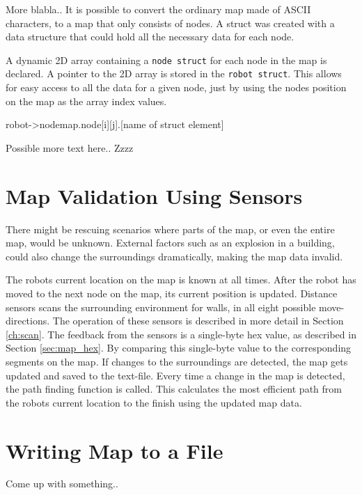More blabla.. It is possible to convert the ordinary map made of ASCII characters, to a map that only consists of nodes.
A struct was created with a data structure that could hold all the necessary data for each node.

A dynamic 2D array containing a {\tt node struct} for each node in the map is declared. 
A pointer to the 2D array is stored in the {\tt robot struct}.
This allows for easy access to all the data for a given node, just by using the nodes position on the map as the array index values.

robot->nodemap.node[i][j].[name of struct element]

Possible more text here.. Zzzz

\section{Map Validation Using Sensors}
\label{sec:map_check} %
There might be rescuing scenarios where parts of the map, or even the entire map, would be unknown.
External factors such as an explosion in a building, could also change the surroundings dramatically, making the map data invalid.
 
The robots current location on the map is known at all times. 
After the robot has moved to the next node on the map, its current position is updated.
Distance sensors scans the surrounding environment for walls, in all eight possible move-directions.
The operation of these sensors is described in more detail in Section \ref{ch:scan}.
The feedback from the sensors is a single-byte hex value, as described in Section \ref{sec:map_hex}.
By comparing this single-byte value to the corresponding segments on the map.
If changes to the surroundings are detected, the map gets updated and saved to the text-file.
Every time a change in the map is detected, the path finding function is called. This calculates the most efficient path from the robots current location to the finish using the updated map data. 

\section{Writing Map to a File}
\label{sec:map_save} %
Come up with something..



